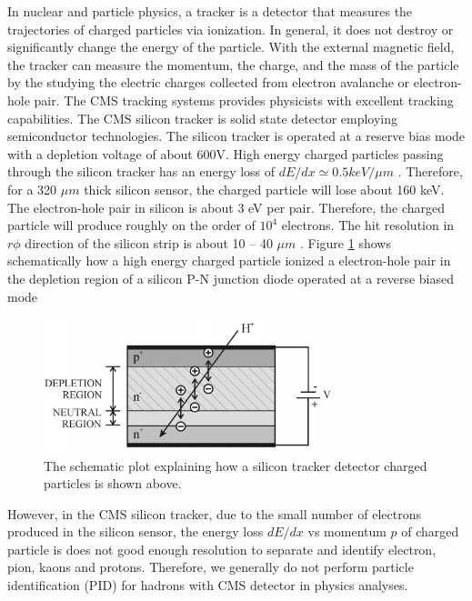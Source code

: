In nuclear and particle physics, a tracker is a detector that measures the trajectories of charged particles via ionization. In general, it does not destroy or significantly change the energy of the particle. With the external magnetic field, the tracker can measure the momentum, the charge, and the mass of the particle by the studying the electric charges collected from electron avalanche or electron-hole pair. The CMS tracking systems provides physicists with excellent tracking capabilities. The CMS silicon tracker is solid state detector employing semiconductor technologies. The silicon tracker is operated at a reserve bias mode with a depletion voltage of about 600V. High energy charged particles passing through the silicon tracker has an energy loss of $dE/dx \simeq 0.5 keV/\mu m$ \cite{AlphaTheoEx}. Therefore, for a 320 $\mu m$ thick silicon sensor, the charged particle will lose about 160 keV. The electron-hole pair in silicon is about 3 eV per pair. Therefore, the charged particle will produce roughly on the order of $10^4$ electrons. The hit resolution in $r\phi$ direction of the silicon strip is about 10 -- 40 $\mu m$ \cite{CMSTrackComp}. Figure \ref{SiliconDetector} shows schematically how a high energy charged particle ionized a electron-hole pair in the depletion region of a silicon P-N junction diode operated at a reverse biased mode


\begin{figure}[hbtp]
\begin{center}
\includegraphics[width=0.75\textwidth]{Figures/Chapter2/SiliconDetector.png}
\caption{The schematic plot explaining how a silicon tracker detector charged particles is shown above.}
\label{SiliconDetector}
\end{center}
\end{figure} 

However, in the CMS silicon tracker, due to the small number of electrons produced in the silicon sensor, the energy loss $dE/dx$ vs momentum $p$ of charged particle is does not good enough resolution to separate and identify electron, pion, kaons and protons. Therefore, we generally do not perform particle identification (PID) for hadrons with CMS detector in physics analyses.  

